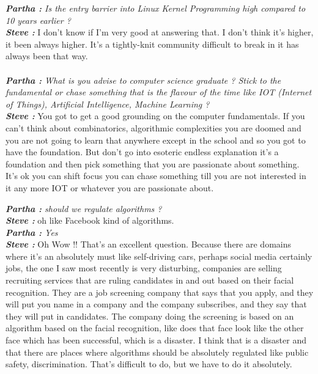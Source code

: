 \documentclass[a4paper, 12pt]{article}
\begin{document}
\begin{flushleft}
        \textit {\textbf {Partha :} Is the entry barrier into Linux Kernel Programming high compared to 10 years earlier ?  \\}
        \textit {\textbf {Steve :}} I don’t know if I'm very good at answering that. I don't think it's higher, it been always higher. It’s a tightly-knit community difficult to break in  it has always been that way. \\~\\

        \textit {\textbf {Partha :} What is you advise to computer science graduate ? Stick to the fundamental or chase something that is the flavour of the time like IOT (Internet of Things), Artificial Intelligence, Machine Learning ? \\}
        \textit {\textbf {Steve :}} You got to get a good grounding on the computer fundamentals. If you can’t think about combinatorics, algorithmic complexities you are doomed and you are not going to learn that anywhere except in the school and so you got to have the foundation. But don't go into esoteric endless explanation it's a foundation and then pick something that you are passionate about something. It's ok you can shift focus you can chase something till you are not interested in it any more IOT or whatever you are passionate about.

        \textit {\textbf {Partha :} should we regulate algorithms ? \\}
        \textit {\textbf {Steve :}} oh like Facebook kind of algorithms. \\
        \textit {\textbf {Partha :} Yes  \\}
        \textit {\textbf {Steve :}} Oh Wow !! That’s an excellent question. Because there are domains where it's an absolutely must like self-driving cars, perhaps social media certainly jobs, the one I saw most recently is very disturbing, companies are selling recruiting services that are ruling candidates in and out based on their facial recognition. They are a job screening company that says that you apply,  and they will put you name in a company and the company subscribes, and they say that they will put in candidates. The company doing the screening is based on an algorithm based on the facial recognition, like does that face look like the other face which has been successful, which is a disaster.  I think that is a disaster and that there are places where algorithms should be absolutely regulated like public safety, discrimination. That's difficult to do, but we have to do it absolutely. \\~\\


\end{flushleft}
\end{document}
